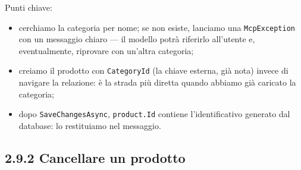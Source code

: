 \documentclass[
  italian,
  10pt,
]{book}
\newenvironment{Shaded}{\begin{snugshade}}{\end{snugshade}}
\newcommand{\DataTypeTok}[1]{\textcolor[rgb]{0.13,0.29,0.53}{#1}}
\newcommand{\FunctionTok}[1]{\textcolor[rgb]{0.13,0.29,0.53}{\textbf{#1}}}
\newcommand{\KeywordTok}[1]{\textcolor[rgb]{0.13,0.29,0.53}{\textbf{#1}}}
\newcommand{\NormalTok}[1]{#1}
\newcommand{\OperatorTok}[1]{\textcolor[rgb]{0.81,0.36,0.00}{\textbf{#1}}}
\newcommand{\StringTok}[1]{\textcolor[rgb]{0.31,0.60,0.02}{#1}}
\providecommand{\tightlist}{%
  \setlength{\itemsep}{0pt}\setlength{\parskip}{0pt}}
\begin{document}
\begin{Shaded}
\end{Shaded}

Punti chiave:

\begin{itemize}
\tightlist
\item
  cerchiamo la categoria per nome; se non esiste, lanciamo una
  \texttt{McpException} con un messaggio chiaro --- il modello potrà
  riferirlo all'utente e, eventualmente, riprovare con un'altra
  categoria;
\item
  creiamo il prodotto con \texttt{CategoryId} (la chiave esterna, già
  nota) invece di navigare la relazione: è la strada più diretta quando
  abbiamo già caricato la categoria;
\item
  dopo \texttt{SaveChangesAsync}, \texttt{product.Id} contiene
  l'identificativo generato dal database: lo restituiamo nel messaggio.
\end{itemize}

\subsection{2.9.2 Cancellare un prodotto}\label{cancellare-un-prodotto}
\end{document}
